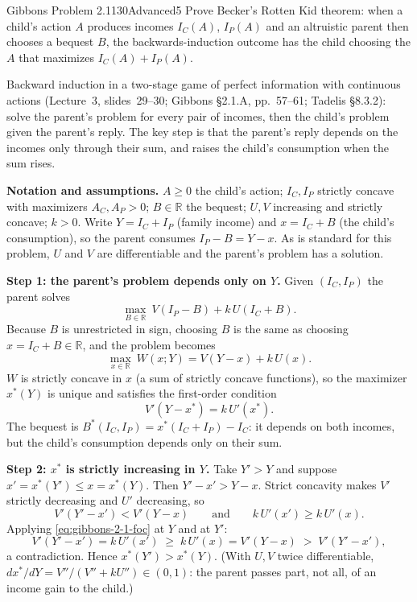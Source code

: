 \begin{exsol}{Gibbons Problem 2.1}{130}{Advanced}{5}
\asked Prove Becker's Rotten Kid theorem: when a child's action $A$ produces incomes
$I_C(A)$, $I_P(A)$ and an altruistic parent then chooses a bequest $B$, the backwards-induction
outcome has the child choosing the $A$ that maximizes $I_C(A) + I_P(A)$.

\method Backward induction in a two-stage game of perfect information with continuous actions
(Lecture~3, slides~29--30; Gibbons \S2.1.A, pp.~57--61; Tadelis \S8.3.2): solve the parent's
problem for every pair of incomes, then the child's problem given the parent's reply. The key step
is that the parent's reply depends on the incomes only through their sum, and raises the child's
consumption when the sum rises.

\solution
\textbf{Notation and assumptions.} $A \ge 0$ the child's action; $I_C, I_P$ strictly concave with
maximizers $A_C, A_P > 0$; $B \in \mathbb{R}$ the bequest; $U, V$ increasing and strictly concave;
$k > 0$. Write $Y = I_C + I_P$ (family income) and $x = I_C + B$ (the child's consumption), so the
parent consumes $I_P - B = Y - x$. As is standard for this problem, $U$ and $V$ are
differentiable and the parent's problem has a solution.

\textbf{Step 1: the parent's problem depends only on $Y$.} Given $(I_C, I_P)$ the parent solves
\[
  \max_{B \in \mathbb{R}}\ V(I_P - B) + k\,U(I_C + B).
\]
Because $B$ is unrestricted in sign, choosing $B$ is the same as choosing $x = I_C + B \in \mathbb{R}$,
and the problem becomes
\begin{equation}
  \max_{x \in \mathbb{R}}\ W(x; Y) = V(Y - x) + k\,U(x). \label{eq:gibbons-2-1-W}
\end{equation}
$W$ is strictly concave in $x$ (a sum of strictly concave functions), so the maximizer $x^*(Y)$ is
unique and satisfies the first-order condition
\begin{equation}
  V'(Y - x^*) = k\,U'(x^*). \label{eq:gibbons-2-1-foc}
\end{equation}
The bequest is $B^*(I_C, I_P) = x^*(I_C + I_P) - I_C$: it depends on both incomes, but the child's
consumption depends only on their sum.

\textbf{Step 2: $x^*$ is strictly increasing in $Y$.} Take $Y' > Y$ and suppose
$x' = x^*(Y') \le x = x^*(Y)$. Then $Y' - x' > Y - x$. Strict concavity makes $V'$ strictly
decreasing and $U'$ decreasing, so
\[
  V'(Y' - x') < V'(Y - x) \qquad\text{and}\qquad k\,U'(x') \ge k\,U'(x).
\]
Applying \eqref{eq:gibbons-2-1-foc} at $Y$ and at $Y'$:
\[
  V'(Y' - x') = k\,U'(x') \;\ge\; k\,U'(x) = V'(Y - x) \;>\; V'(Y' - x'),
\]
a contradiction. Hence $x^*(Y') > x^*(Y)$. (With $U, V$ twice differentiable,
$dx^*/dY = V''/(V'' + kU'') \in (0,1)$: the parent passes part, not all, of an income gain to the
child.)


\end{exsol}
